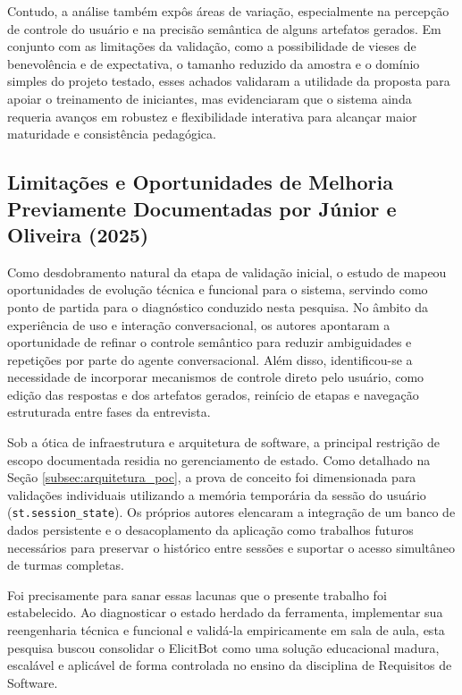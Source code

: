Contudo, a análise também expôs áreas de variação, especialmente na percepção de controle do usuário e na precisão semântica de alguns artefatos gerados. Em conjunto com as limitações da validação, como a possibilidade de vieses de benevolência e de expectativa, o tamanho reduzido da amostra e o domínio simples do projeto testado, esses achados validaram a utilidade da proposta para apoiar o treinamento de iniciantes, mas evidenciaram que o sistema ainda requeria avanços em robustez e flexibilidade interativa para alcançar maior maturidade e consistência pedagógica.

\subsection{Limitações e Oportunidades de Melhoria Previamente Documentadas por Júnior e Oliveira (2025)}

Como desdobramento natural da etapa de validação inicial, o estudo de  mapeou oportunidades de evolução técnica e funcional para o sistema, servindo como ponto de partida para o diagnóstico conduzido nesta pesquisa. No âmbito da experiência de uso e interação conversacional, os autores apontaram a oportunidade de refinar o controle semântico para reduzir ambiguidades e repetições por parte do agente conversacional. Além disso, identificou-se a necessidade de incorporar mecanismos de controle direto pelo usuário, como edição das respostas e dos artefatos gerados, reinício de etapas e navegação estruturada entre fases da entrevista.

Sob a ótica de infraestrutura e arquitetura de software, a principal restrição de escopo documentada residia no gerenciamento de estado. Como detalhado na Seção \ref{subsec:arquitetura_poc}, a prova de conceito foi dimensionada para validações individuais utilizando a memória temporária da sessão do usuário (\texttt{st.session\_state}). Os próprios autores elencaram a integração de um banco de dados persistente e o desacoplamento da aplicação como trabalhos futuros necessários para preservar o histórico entre sessões e suportar o acesso simultâneo de turmas completas.

Foi precisamente para sanar essas lacunas que o presente trabalho foi estabelecido. Ao diagnosticar o estado herdado da ferramenta, implementar sua reengenharia técnica e funcional e validá-la empiricamente em sala de aula, esta pesquisa buscou consolidar o ElicitBot como uma solução educacional madura, escalável e aplicável de forma controlada no ensino da disciplina de Requisitos de Software.

